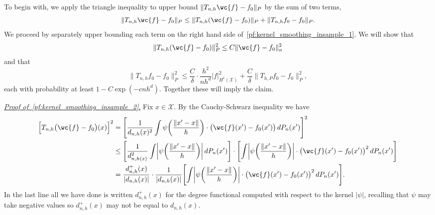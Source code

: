 \documentclass[aos]{imsart}
\theoremstyle{plain}
\theoremstyle{definition}
\theoremstyle{remark}
\newcommand{\mc}[1]{\mathcal{#1}}
\newcommand{\1}{\mathbf{1}}
\begin{document}
To begin with, we apply the triangle inequality to upper bound $\|T_{n,h}\wc{f} - f_0\|_P$ by the sum of two terms,
\begin{equation}
\label{pf:kernel_smoothing_insample_1}
\|T_{n,h}\wc{f} - f_0\|_P \leq \|T_{n,h}(\wc{f} - f_0)\|_P + \|T_{n,h}f_0 - f_0\|_P.
\end{equation}
We proceed by separately upper bounding each term on the right hand side of~\eqref{pf:kernel_smoothing_insample_1}. We will show that
\begin{equation}
\label{pf:kernel_smoothing_insample_2}
\|T_{n,h}(\wc{f} - f_0)\|_P^2 \leq C \|\wc{f} - f_0\|_n^2
\end{equation}
and that 
\begin{equation}
\label{pf:kernel_smoothing_insample_3}
\|T_{n,h}f_0 - f_0\|_P^2 \leq \frac{C}{\delta} \cdot \frac{h^2}{nh^d} |f|_{H^1(\mc{X})}^2 + \frac{C}{\delta}\|T_{h,P}f_0 - f_0\|_P^2,
\end{equation}
each with probability at least $1 - C\exp(-cnh^d)$. Together these will imply the claim. 

\underline{\emph{Proof of~\eqref{pf:kernel_smoothing_insample_2}}.}
Fix $x \in \mc{X}$. By the Cauchy-Schwarz inequality we have
\begin{align*}
\Bigl[T_{n,h}\bigl(\wc{f} - f_0\bigr)(x)\Bigr]^2 & = \Biggl[\frac{1}{d_{n,h}(x)^2}\int \psi\biggl(\frac{\|x' - x\|}{h}\biggr) \cdot \bigl(\wc{f}(x') - f_0(x')\bigr) \,dP_n(x')\Biggr]^2 \\
& \leq \Biggl[\frac{1}{d_{n,h(x)}^2} \int \biggl|\psi\biggl(\frac{\|x' - x\|}{h}\biggr)\biggr| \,dP_n(x')\Biggr] \cdot \Biggl[\int \biggl|\psi\biggl(\frac{\|x' - x\|}{h}\biggr)\biggr| \cdot \bigl(\wc{f}(x') - f_0(x')\bigr)^2 \,dP_n(x')\Biggr] \\
& = \frac{d_{n,h}^{+}(x)}{|d_{n,h}(x)|} \cdot \frac{1}{|d_{n,h}(x)|} \Biggl[\int \biggl|\psi\biggl(\frac{\|x' - x\|}{h}\biggr)\biggr| \cdot \bigl(\wc{f}(x') - f_0(x')\bigr)^2 \,dP_n(x')\Biggr].
\end{align*}
In the last line all we have done is written $d_{n,h}^{+}(x)$ for the degree functional computed with respect to the kernel $|\psi|$, recalling that $\psi$ may take negative values so $d_{n,h}^{+}(x)$ may not be equal to $d_{n,h}(x)$.
\end{document}
